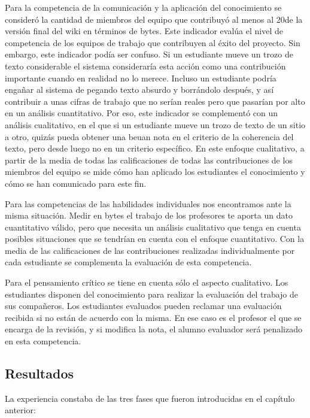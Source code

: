 Para la competencia de la comunicación y la aplicación del conocimiento se consideró la cantidad de miembros del equipo que contribuyó al menos al 20\percentage de la versión final del wiki en términos de bytes. Este indicador evalúa el nivel de competencia de los equipos de trabajo que contribuyen al éxito del proyecto. Sin embargo, este indicador podía ser confuso. Si un estudiante mueve un trozo de texto considerable el sistema consideraría esta acción como una contribución importante cuando en realidad no lo merece. Incluso un estudiante podría engañar al sistema de pegando texto absurdo y borrándolo después, y así contribuir a unas cifras de trabajo que no serían reales pero que pasarían por alto en un análisis cuantitativo. Por eso, este indicador se complementó con un análisis cualitativo, en el que si un estudiante mueve un trozo de texto de un sitio a otro, quizás pueda obtener una beuan nota en el criterio de la coherencia del texto, pero desde luego no en un criterio específico. En este enfoque cualitativo, a partir de la media de todas las calificaciones de todas las contribuciones de los miembros del equipo se mide cómo han aplicado los estudiantes el conocimiento y cómo se han comunicado para este fin.

Para las competencias de las habilidades individuales nos encontramos ante la misma situación. Medir en bytes el trabajo de los profesores te aporta un dato cuantitativo válido, pero que necesita un análisis cualitativo que tenga en cuenta posibles situaciones que se tendrían en cuenta con el enfoque cuantitativo. Con la media de las calificaciones de las contribuciones realizadas individualmente por cada estudiante se complementa la evaluación de esta competencia.

Para el pensamiento crítico se tiene en cuenta sólo el aspecto cualitativo. Los estudiantes disponen del conocimiento para realizar la evaluación del trabajo de sus compañeros. Los estudiantes evaluados pueden reclamar una evaluación recibida si no están de acuerdo con la misma. En ese caso es el profesor el que se encarga de la revisión, y si modifica la nota, el alumno evaluador será penalizado en esta competencia.

\subsection{Resultados}
La experiencia constaba de las tres fases que fueron introducidas en el capítulo anterior:

